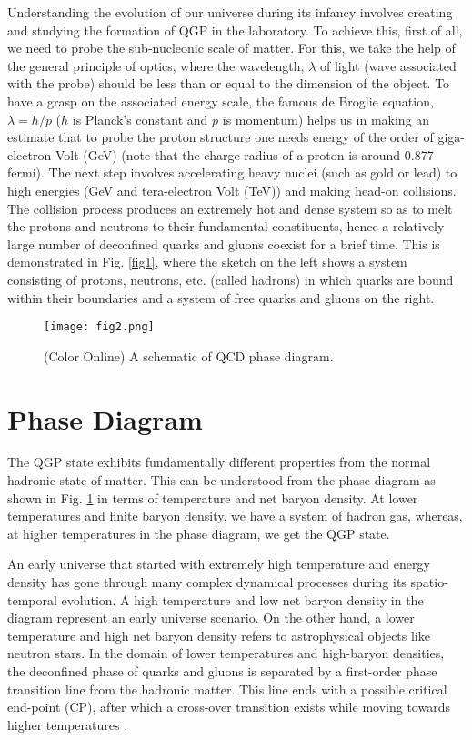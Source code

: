 \documentclass[showpacs,showkeys,aps,twocolumn]{revtex4}
\newcommand\+{\dagger}
\begin{document}
Understanding the evolution of our universe during its infancy involves creating and studying the formation of QGP in the laboratory. To achieve this, first of all, we need to probe the sub-nucleonic scale of matter. For this, we take the help of the general principle of optics, where the wavelength, $\lambda$ of light (wave associated with the probe) should be less than or equal to the dimension of the object. To have a grasp on the associated energy scale, the famous de Broglie equation, $\lambda  = h/p $ ($h$ is Planck’s constant and $p$ is momentum) helps us in making an estimate that to probe the proton structure one needs energy of the order of giga-electron Volt (GeV) (note that the charge radius of a proton is around 0.877 fermi). The next step involves accelerating heavy nuclei (such as gold or lead) to high energies (GeV and tera-electron Volt (TeV)) and making head-on collisions. The collision process produces an extremely hot and dense system so as to melt the protons and neutrons to their fundamental constituents, hence a relatively large number of deconfined quarks and gluons coexist for a brief time. This is demonstrated in Fig. \ref{fig1}, where the sketch on the left shows a system consisting of protons, neutrons, etc. (called hadrons) in which quarks are bound within their boundaries and a system of free quarks and gluons on the right.


\begin{figure}[ht]
\texttt{[image: fig2.png]}
\caption[]{(Color Online) A schematic of QCD phase diagram.}
\label{fig2}
\end{figure}


\section{Phase Diagram}
\label{section2}
The QGP state exhibits fundamentally different properties from the normal hadronic state of matter. This can be understood from the phase diagram as shown in Fig. \ref{fig2} in terms of temperature and net baryon density. At lower temperatures and finite baryon density, we have a system of hadron gas, whereas, at higher temperatures in the phase diagram, we get the QGP state. 

An early universe that started with extremely high temperature and energy density has gone through many complex dynamical processes during its spatio-temporal evolution. A high temperature and low net baryon density in the diagram represent an early universe scenario. On the other hand, a lower temperature and high net baryon density refers to astrophysical objects like neutron stars. In the domain of lower temperatures and high-baryon densities, the deconfined phase of quarks and gluons is separated by a first-order phase transition line from the hadronic matter. This line ends with a possible critical end-point (CP), after which a cross-over transition exists while moving towards higher temperatures \cite{Ref3}.
\end{document}
